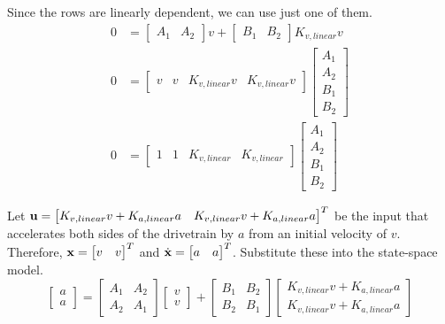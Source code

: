 Since the rows are linearly dependent, we can use just one of them.
\begin{align*}
  0 &=
    \begin{bmatrix}
      A_1 & A_2
    \end{bmatrix} v +
    \begin{bmatrix}
      B_1 & B_2
    \end{bmatrix} K_{v,linear} v \\
  0 &=
    \begin{bmatrix}
      v & v & K_{v,linear} v & K_{v,linear} v
    \end{bmatrix}
    \begin{bmatrix}
      A_1 \\
      A_2 \\
      B_1 \\
      B_2
    \end{bmatrix} \\
  0 &=
    \begin{bmatrix}
      1 & 1 & K_{v,linear} & K_{v,linear}
    \end{bmatrix}
    \begin{bmatrix}
      A_1 \\
      A_2 \\
      B_1 \\
      B_2
    \end{bmatrix}
\end{align*}

Let $\mathbf{u} =
\begin{bmatrix}
  K_{v,linear} v + K_{a,linear} a & K_{v,linear} v + K_{a,linear} a
\end{bmatrix}^T$ be the input that accelerates both sides of the drivetrain by
$a$ from an initial velocity of $v$. Therefore, $\mathbf{x} =
\begin{bmatrix}
  v & v
\end{bmatrix}^T$ and $\dot{\mathbf{x}} =
\begin{bmatrix}
  a & a
\end{bmatrix}^T$. Substitute these into the state-space model.
\begin{equation*}
  \begin{bmatrix}
    a \\
    a
  \end{bmatrix} =
  \begin{bmatrix}
    A_1 & A_2 \\
    A_2 & A_1
  \end{bmatrix}
  \begin{bmatrix}
    v \\
    v
  \end{bmatrix} +
  \begin{bmatrix}
    B_1 & B_2 \\
    B_2 & B_1
  \end{bmatrix}
  \begin{bmatrix}
    K_{v,linear} v + K_{a,linear} a \\
    K_{v,linear} v + K_{a,linear} a
  \end{bmatrix}
\end{equation*}


